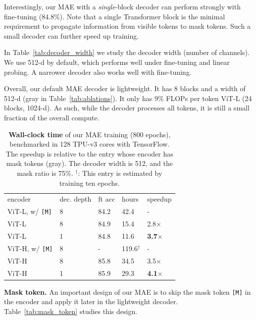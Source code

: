\documentclass[10pt,twocolumn,letterpaper]{article}
\newcommand{\tablestyle}[2]{\setlength{\tabcolsep}{#1}\renewcommand{\arraystretch}{#2}\centering\footnotesize}
\renewcommand{\paragraph}[1]{\vspace{1.25mm}\noindent\textbf{#1}}
\newcommand{\gc}[1]{\textcolor{deemph}{#1}}
\begin{document}
Interestingly, our MAE with a \textit{single}-block decoder can perform strongly with fine-tuning (84.8\%). Note that a single Transformer block is the minimal requirement to propagate information from visible tokens to mask tokens. Such a small decoder can further speed up training.

In Table~\ref{tab:decoder_width} we study the decoder width (number of channels). We use 512-d by default, which performs well under fine-tuning and linear probing. A narrower decoder also works well with fine-tuning.

Overall, our default MAE decoder is lightweight. It has 8 blocks and a width of 512-d (\colorbox{baselinecolor}{gray} in Table~\ref{tab:ablations}). It only has 9\% FLOPs per token \vs ViT-L (24 blocks, 1024-d). As such, while the decoder processes all tokens, it is still a small fraction of the overall compute.

\begin{table}
\tablestyle{2pt}{1.1}
\begin{tabular}{y{56}x{36}x{32}x{28}x{28}}
encoder & dec. depth & ft acc & hours & speedup \\
\shline
\gc{ViT-L, w/ \texttt{[M]}} & \gc{8} & \gc{84.2} & \gc{42.4} & \gc{-} \\
ViT-L & 8 & 84.9 & 15.4 & 2.8$\times$ \\
ViT-L & 1 & 84.8 & 11.6 & \textbf{3.7}$\times$ \\
\hline
\gc{ViT-H, w/ \texttt{[M]}} & \gc{8} & \gc{-} & \gc{119.6$^\dagger$} & \gc{-} \\
ViT-H & 8 & 85.8 & 34.5 & 3.5$\times$ \\
ViT-H & 1 & 85.9 & 29.3 & \textbf{4.1}$\times$ \\
\end{tabular}
\vspace{-.7em}
\caption{\textbf{Wall-clock time} of our MAE training (800 epochs), benchmarked in 128 TPU-v3 cores with TensorFlow. The speedup is relative to the entry whose encoder has mask tokens (\gc{gray}). The decoder width is 512, and the mask ratio is 75\%. $^\dagger$: This entry is estimated by training ten epochs.}
\label{tab:wallclock}
\vspace{-.5em}
\end{table}

\paragraph{Mask token.} An important design of our MAE is to skip the mask token \texttt{[M]} in the encoder and apply it later in the lightweight decoder. Table~\ref{tab:mask_token} studies this design.
\end{document}
